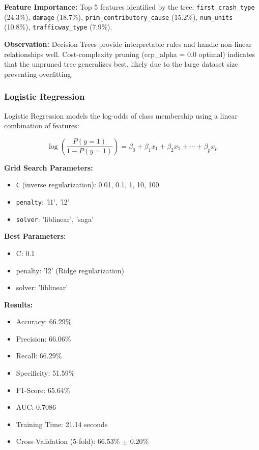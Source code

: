 \documentclass[12pt,man]{apa7}
\begin{document}
\textbf{Feature Importance:} Top 5 features identified by the tree: \texttt{first\_crash\_type} (24.3\%), \texttt{damage} (18.7\%), \texttt{prim\_contributory\_cause} (15.2\%), \texttt{num\_units} (10.8\%), \texttt{trafficway\_type} (7.9\%).

\textbf{Observation:} Decision Trees provide interpretable rules and handle non-linear relationships well. Cost-complexity pruning (ccp\_alpha = 0.0 optimal) indicates that the unpruned tree generalizes best, likely due to the large dataset size preventing overfitting.

\subsubsection{Logistic Regression}

Logistic Regression models the log-odds of class membership using a linear combination of features:

\begin{equation}
\log \left( \frac{P(y=1)}{1 - P(y=1)} \right) = \beta_0 + \beta_1 x_1 + \beta_2 x_2 + \cdots + \beta_p x_p
\end{equation}

\textbf{Grid Search Parameters:}
\begin{itemize}
    \item \texttt{C} (inverse regularization): 0.01, 0.1, 1, 10, 100
    \item \texttt{penalty}: 'l1', 'l2'
    \item \texttt{solver}: 'liblinear', 'saga'
\end{itemize}

\textbf{Best Parameters:}
\begin{itemize}
    \item C: 0.1
    \item penalty: 'l2' (Ridge regularization)
    \item solver: 'liblinear'
\end{itemize}

\textbf{Results:}
\begin{itemize}
    \item Accuracy: 66.29\%
    \item Precision: 66.06\%
    \item Recall: 66.29\%
    \item Specificity: 51.59\%
    \item F1-Score: 65.64\%
    \item AUC: 0.7086
    \item Training Time: 21.14 seconds
    \item Cross-Validation (5-fold): 66.53\% $\pm$ 0.20\%
\end{itemize}
\end{document}
